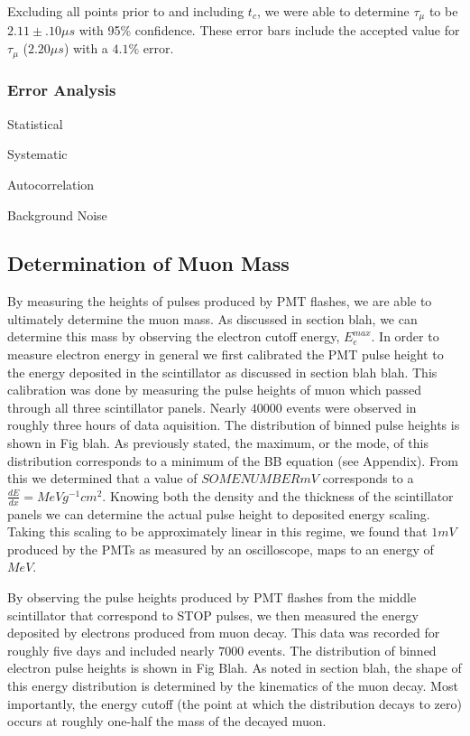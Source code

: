 Excluding all points prior to and including $t_{c}$, we were able to determine $\tau_{\mu}$ to be $2.11 \pm .10 \mu s$ with 95\% confidence.  These error bars include the accepted value for $\tau_{\mu}$ ($2.20\mu s$) with a $4.1\%$ error.

\subsubsection{Error Analysis}

Statistical

Systematic

Autocorrelation

Background Noise

\subsection{Determination of Muon Mass}

By measuring the heights of pulses produced by PMT flashes, we are able to ultimately determine the muon mass.  As discussed in section blah, we can determine this mass by observing the electron cutoff energy, $E_{e}^{max}$. In order to measure electron energy in general we first calibrated the PMT pulse height to the energy deposited in the scintillator as discussed in section blah blah. This calibration was done by measuring the pulse heights of muon which passed through all three scintillator panels.  Nearly $40000$ events were observed in roughly three hours of data aquisition.  The distribution of binned pulse heights is shown in Fig blah.  As previously stated, the maximum, or the mode, of this distribution corresponds to a minimum of the BB equation (see Appendix).  From this we determined that a value of $SOME NUMBER mV$ corresponds to a $\frac{dE}{dx}= MeV g^{-1} cm^{2}$.  Knowing both the density and the thickness of the scintillator panels we can determine the actual pulse height to deposited energy scaling.  Taking this scaling to be approximately linear in this regime, we found that $1mV$ produced by the PMTs as measured by an oscilloscope, maps to an energy of $MeV$. 

By observing the pulse heights produced by PMT flashes from the middle scintillator that correspond to STOP pulses, we then measured the energy deposited by electrons produced from muon decay.  This data was recorded for roughly five days and included nearly $7000$ events.  The distribution of binned electron pulse heights is shown in Fig Blah.  As noted in section blah, the shape of this energy distribution is determined by the kinematics of the muon decay.  Most importantly, the energy cutoff (the point at which the distribution decays to zero) occurs at roughly one-half the mass of the decayed muon.

